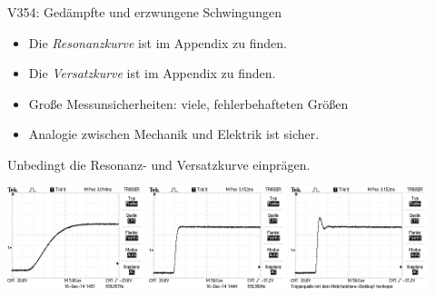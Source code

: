\begin{Versuch}{V354: Gedämpfte und erzwungene Schwingungen}
\begin{Auswertung}
\begin{itemize}
    		\item Die \emph{Resonanzkurve} ist im Appendix zu finden.
    		\item Die \emph{Versatzkurve} ist im Appendix zu finden.

    	\end{itemize}
    \end{Auswertung}

    \begin{Diskussion}
    	\begin{itemize}
    		\item Große Messunsicherheiten: viele, fehlerbehafteten Größen
    		\item Analogie zwischen Mechanik und Elektrik ist sicher.
    	\end{itemize}
    \end{Diskussion}

    \begin{Merke}
    	Unbedingt die Resonanz- und Versatzkurve einprägen.
    \end{Merke}

\newpage
\thispagestyle{empty}
    \begin{Appendix}
    		\includegraphics[width=0.3\textwidth]{build/Bilder/kr.JPG}
    		\includegraphics[width=0.3\textwidth]{build/Bilder/ap.JPG}
    		\includegraphics[width=0.3\textwidth]{build/Bilder/sw.JPG}


\end{Appendix}
\end{Versuch}
